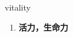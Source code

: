 
\begin{frame}
{\huge vitality}
\begin{center}
\begin{enumerate}\Large
  \item \textbf{活力，生命力}
\end{enumerate}
\end{center}
\end{frame}
